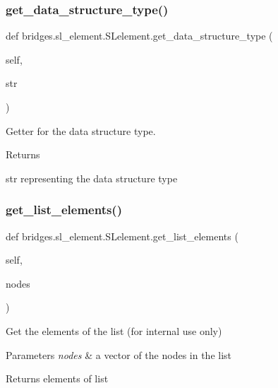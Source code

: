 \subsubsection{\texorpdfstring{get\+\_\+data\+\_\+structure\+\_\+type()}{get\_data\_structure\_type()}}
{\footnotesize\ttfamily def bridges.\+sl\+\_\+element.\+S\+Lelement.\+get\+\_\+data\+\_\+structure\+\_\+type (\begin{DoxyParamCaption}\item[{}]{self,  }\item[{}]{str }\end{DoxyParamCaption})}



Getter for the data structure type. 

\begin{DoxyReturn}{Returns}


str representing the data structure type 
\end{DoxyReturn}
\mbox{\label{classbridges_1_1sl__element_1_1_s_lelement_ad3b94c8e7540aca841e6306c190e1be1}} 
\subsubsection{\texorpdfstring{get\+\_\+list\+\_\+elements()}{get\_list\_elements()}}
{\footnotesize\ttfamily def bridges.\+sl\+\_\+element.\+S\+Lelement.\+get\+\_\+list\+\_\+elements (\begin{DoxyParamCaption}\item[{}]{self,  }\item[{}]{nodes }\end{DoxyParamCaption})}



Get the elements of the list (for internal use only) 


\begin{DoxyParams}{Parameters}
{\em nodes} & a vector of the nodes in the list \\
\hline
\end{DoxyParams}
\begin{DoxyReturn}{Returns}
elements of list 
\end{DoxyReturn}
\mbox{\label{classbridges_1_1sl__element_1_1_s_lelement_a7aaed085f18082fab6d027ca014130ca}} 
